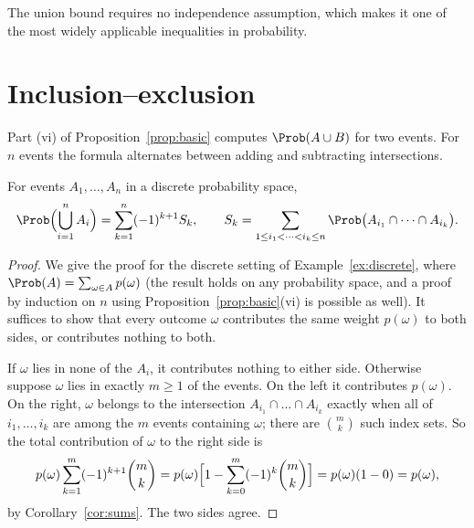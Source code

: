 The union bound requires no independence assumption, which makes it one of the
most widely applicable inequalities in probability.

\section{Inclusion--exclusion}

Part (vi) of Proposition~\ref{prop:basic} computes $\Prob(A\cup B)$ for two
events. For $n$ events the formula alternates between adding and subtracting
intersections.

\begin{theorem}\label{thm:incexc}
For events $A_1,\dots,A_n$ in a discrete probability space,
\[
\Prob\Bigl(\bigcup_{i=1}^nA_i\Bigr)=\sum_{k=1}^n(-1)^{k+1}S_k,
\qquad
S_k=\sum_{1\le i_1<\dots<i_k\le n}\Prob\bigl(A_{i_1}\cap\dots\cap A_{i_k}\bigr).
\]
\end{theorem}
\begin{proof}
We give the proof for the discrete setting of Example~\ref{ex:discrete}, where
$\Prob(A)=\sum_{\omega\in A}p(\omega)$ (the result holds on any probability
space, and a proof by induction on $n$ using Proposition~\ref{prop:basic}(vi)
is possible as well). It suffices to show that every outcome $\omega$
contributes the same weight $p(\omega)$ to both sides, or contributes nothing
to both.

If $\omega$ lies in none of the $A_i$, it contributes nothing to either side.
Otherwise suppose $\omega$ lies in exactly $m\ge1$ of the events. On the left
it contributes $p(\omega)$. On the right, $\omega$ belongs to the intersection
$A_{i_1}\cap\dots\cap A_{i_k}$ exactly when all of $i_1,\dots,i_k$ are among the
$m$ events containing $\omega$; there are $\binom mk$ such index sets. So the
total contribution of $\omega$ to the right side is
\[
p(\omega)\sum_{k=1}^m(-1)^{k+1}\binom mk
=p(\omega)\Bigl[1-\sum_{k=0}^m(-1)^k\binom mk\Bigr]=p(\omega)(1-0)=p(\omega),
\]
by Corollary~\ref{cor:sums}. The two sides agree.
\end{proof}

